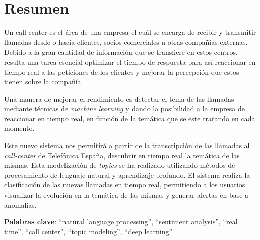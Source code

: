 




\chapter*{Resumen}



Un call-center es el área de una empresa el cuál se encarga de recibir y transmitir llamadas desde o hacia clientes, socios comerciales u otras compañías externas. Debido a la gran cantidad de información que se transfiere en estos centros, resulta una tarea esencial optimizar el tiempo de respuesta para así reaccionar en tiempo real a las peticiones de los clientes y mejorar la percepción que estos tienen sobre la compañía. 

Una manera de mejorar el rendimiento es detectar el tema de las llamadas  mediante técnicas de \textit{machine learning} y dando la posibilidad a la empresa de reaccionar en tiempo real, en función de la temática que se este tratando en cada momento. 




Este nuevo sistema nos permitirá a partir de la transcripción de las llamadas al \textit{call-center} de Telefónica España, descubrir en tiempo real la temática de las mismas. Esta modelización de \textit{topics} se ha realizado utilizando métodos de procesamiento de lenguaje natural y aprendizaje profundo. El sistema realiza la clasificación de las nuevas llamadas en tiempo real, permitiendo a los usuarios visualizar la evolución en la temática de las mismas y generar alertas en base a anomalías.  

\onehalfspacing

\vspace{1.5cm}

\textbf{Palabras clave}: ``natural language processing'', ``sentiment analysis'', ``real time'', ``call center'', ``topic modeling'', ``deep learning''